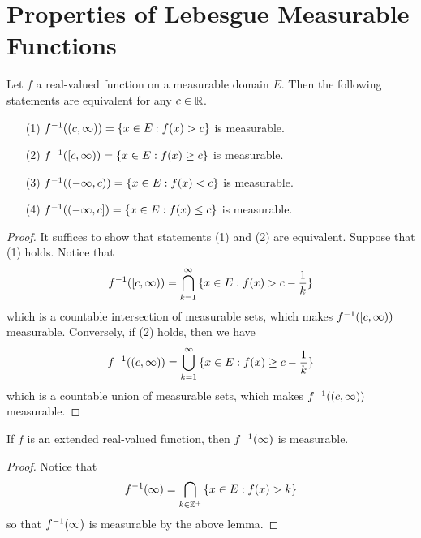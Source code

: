 \section{Properties of Lebesgue Measurable Functions}

\begin{lemma}\label{9.1.1}
    Let $f$ a real-valued function on a measurable domain $E$. Then the following
    statements are equivalent for any $c \in \mathbb{R}$.
    \begin{enumerate}
        \item[(1)] $f^{-1}((c,\infty))=\{x \in E : f(x)>c\}$ is measurable.

        \item[(2)] $f^{-1}([c,\infty))=\{x \in E : f(x)\geq c\}$ is measurable.

        \item[(3)] $f^{-1}((-\infty,c))=\{x \in E : f(x)<c\}$ is measurable.

        \item[(4)] $f^{-1}((-\infty,c])=\{x \in E : f(x) \leq c\}$ is measurable.
    \end{enumerate}
\end{lemma}
\begin{proof}
    It suffices to show that statements (1) and (2) are equivalent. Suppose that
    (1) holds. Notice that
    \begin{equation*}
        f^{-1}([c,\infty))=\bigcap_{k=1}^\infty{\{x \in E : f(x)>c-\frac{1}{k}\}}
    \end{equation*}
    which is a countable intersection of measurable sets, which makes
    $f^{-1}([c,\infty))$ measurable. Conversely, if (2) holds, then we have
    \begin{equation*}
        f^{-1}((c,\infty))=\bigcup_{k=1}^\infty{\{x \in E : f(x) \geq
        c-\frac{1}{k}\}}
    \end{equation*}
    which is a countable union of measurable sets, which makes
    $f^{-1}((c,\infty))$ measurable.
\end{proof}
\begin{corollary}
    If $f$ is an extended real-valued function, then  $f^{-1}(\infty)$ is
    measurable.
\end{corollary}
\begin{proof}
    Notice that
    \begin{equation*}
        f^{-1}(\infty)=\bigcap_{k \in \mathbb{Z}^+}{\{x \in E : f(x)>k\}}
    \end{equation*}
    so that $f^{-1}(\infty)$ is measurable by the above lemma.
\end{proof}

